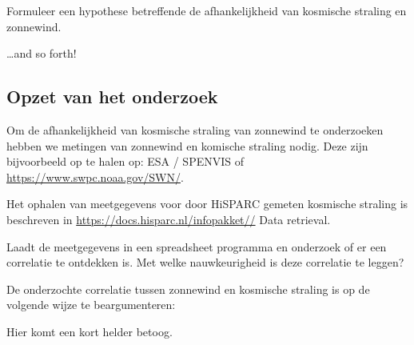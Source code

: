 \begin{questions}

\question Formuleer een hypothese betreffende de afhankelijkheid van
kosmische straling en zonnewind.
\begin{solution}
  \ldots{}and so forth!
\end{solution}


\begin{EnvUplevel}
\section{Opzet van het onderzoek}

Om de afhankelijkheid van kosmische straling van zonnewind te onderzoeken
hebben we metingen van zonnewind en komische straling nodig. Deze zijn
bijvoorbeeld op te halen op: ESA / SPENVIS of
\url{https://www.swpc.noaa.gov/SWN/}.

Het ophalen van meetgegevens voor door HiSPARC gemeten kosmische straling
is beschreven in
\url{https://docs.hisparc.nl/infopakket//} Data
retrieval.

Laadt de meetgegevens in een spreadsheet programma en onderzoek of er een
correlatie te ontdekken is. Met welke nauwkeurigheid is deze correlatie te
leggen?
\end{EnvUplevel}



\question De onderzochte correlatie tussen zonnewind en kosmische straling
is op de volgende wijze te beargumenteren:
\begin{solution}
  Hier komt een kort helder betoog.
\end{solution}


\end{questions}

